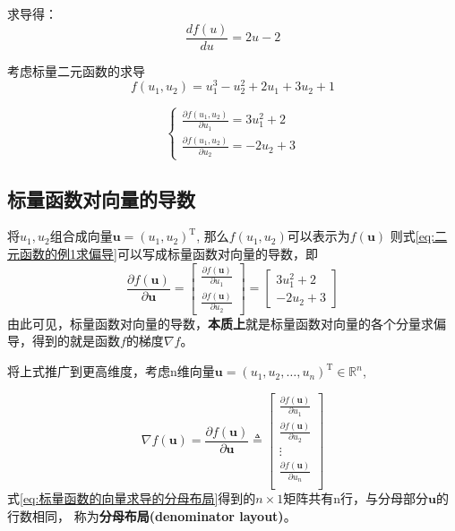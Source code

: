 \documentclass[withoutpreface,bwprint]{NoteBook}
\begin{document}
求导得：
\begin{equation}
    \label{eq:标量导数}  %
    \frac{df(u)}{du}= 2u-2
\end{equation}

考虑标量二元函数的求导
\begin{equation}
    \label{eq:二元函数的例1}  %
    f(u_1,u_2) = u_1^3 - u_2^2 + 2u_1 + 3u_2 + 1
\end{equation}

\begin{equation}
    \label{eq:二元函数的例1求偏导}  %
    \begin{cases}
        \frac{\partial f(u_1,u_2)}{\partial u_1} = 3u_1^2  + 2\\
        \frac{\partial f(u_1,u_2)}{\partial u_2} =  - 2u_2  + 3
    \end{cases}
\end{equation}

\subsection{标量函数对向量的导数}
将$u_1,u_2$组合成向量$\mathbf{u}=(u_1,u_2)^\mathrm{T}$,
那么$f(u_1,u_2)$可以表示为$f(\mathbf{u})$
则式\cref{eq:二元函数的例1求偏导}可以写成标量函数对向量的导数，即
\begin{equation}
    \label{eq:二元函数的例1对向量求导}
        \frac{\partial f(\mathbf{u})}{\partial \mathbf{u}} =
            \begin{bmatrix}
            \frac{\partial f(\mathbf{u})}{\partial u_1}\\
            \frac{\partial f(\mathbf{u})}{\partial u_2}
            \end{bmatrix}
            = 
            \begin{bmatrix}
            3 u_1^2+2\\
            -2u_2+3
            \end{bmatrix}
\end{equation}
由此可见，标量函数对向量的导数，\textbf{本质上}就是标量函数对向量的各个分量求偏导，得到的就是函数$f$的梯度$\nabla f$。

将上式推广到更高维度，考虑n维向量$\mathbf{u}=(u_1,u_2,\dots, u_n)^\mathrm{T} \in \mathbb{R}^n$,

\begin{equation}
    \label{eq:标量函数的向量求导的分母布局}
        \nabla f(\mathbf{u})
        =
        \frac{\partial f(\mathbf{u})}{\partial \mathbf{u}} 
        \triangleq
        \begin{bmatrix}
        \frac{\partial f(\mathbf{u})}{\partial u_1}\\
        \frac{\partial f(\mathbf{u})}{\partial u_2}\\
        \vdots \\
        \frac{\partial f(\mathbf{u})}{\partial u_n}\\
        \end{bmatrix}
\end{equation}
式\cref{eq:标量函数的向量求导的分母布局}得到的$n \times 1$矩阵共有n行，与分母部分$\mathbf{u}$的行数相同，
称为\textbf{分母布局(denominator layout)}。
\end{document}

